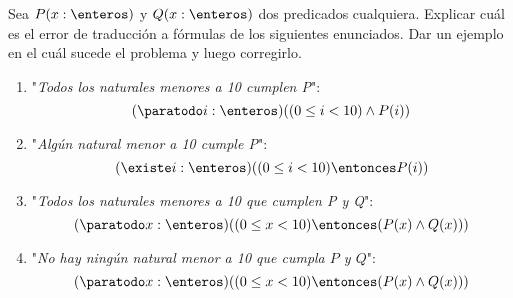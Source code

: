 \begin{enunciado}{\ejercicio}
  Sea $P(x: \enteros)$ y $Q(x: \enteros)$ dos predicados cualquiera. Explicar cuál es el error de traducción a
  fórmulas de los siguientes enunciados. Dar un ejemplo en el cuál sucede el problema y luego corregirlo.
  \begin{enumerate}[label=\alph*)]
    \item "\textit{Todos los naturales menores a 10 cumplen P}":
          $$
            (\paratodo i : \enteros)((0 \leq i < 10) \land P(i))
          $$

    \item "\textit{Algún natural menor a 10 cumple P}":
          $$
            (\existe i : \enteros)((0 \leq i < 10) \entonces P(i))
          $$

    \item "\textit{Todos los naturales menores a 10 que cumplen P y Q}":
          $$
            (\paratodo x : \enteros)((0 \leq x < 10) \entonces (P(x) \land Q(x)))
          $$

    \item "\textit{No hay ningún natural menor a 10 que cumpla $P$ y $Q$}":
          $$
            (\paratodo x : \enteros)((0 \leq x < 10) \entonces (P(x) \land Q(x)))
          $$
  \end{enumerate}
\end{enunciado}

